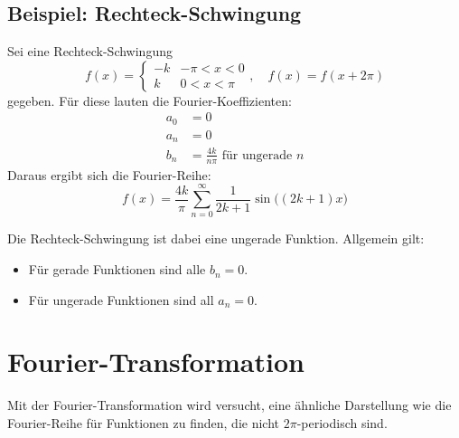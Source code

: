 		\subsection{Beispiel: Rechteck-Schwingung}
			Sei eine Rechteck-Schwingung
			\begin{equation*}
				f(x) =
					\begin{cases}
						-k & -\pi < x < 0 \\
						k  & 0 < x < \pi
					\end{cases},\quad f(x) = f(x + 2\pi)
			\end{equation*}
			gegeben. Für diese lauten die Fourier-Koeffizienten:
			\begin{align*}
				a_0 &= 0 \\
				a_n &= 0 \\
				b_n &= \frac{4k}{n\pi} \text{ für ungerade } n
			\end{align*}
			Daraus ergibt sich die Fourier-Reihe:
			\begin{equation*}
				f(x) = \frac{4k}{\pi} \sum_{n = 0}^{\infty} \frac{1}{2k + 1} \sin\big((2k + 1) x\big)
			\end{equation*}
			
			Die Rechteck-Schwingung ist dabei eine ungerade Funktion. Allgemein gilt:
			\begin{itemize}
				\item Für gerade Funktionen sind alle \( b_n = 0 \).
				\item Für ungerade Funktionen sind all \( a_n = 0 \).
			\end{itemize}

	\section{Fourier-Transformation}
		Mit der Fourier-Transformation wird versucht, eine ähnliche Darstellung wie die Fourier-Reihe für Funktionen zu finden, die nicht \(2\pi\)-periodisch sind.
		
